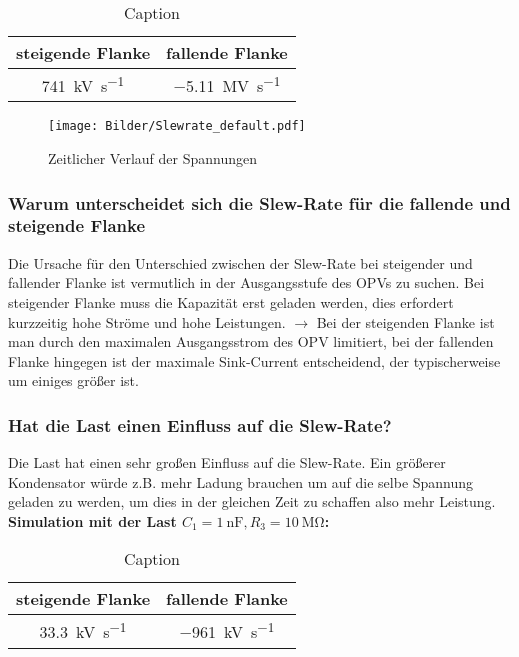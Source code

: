 \begin{table}[H]
    \centering
    \begin{tabular}{|c|c|}
    \hline
         steigende Flanke & fallende Flanke  \\ \hline
         \SI{741}{\kilo \volt \per \second} & \SI{-5.11}{\mega \volt \per \second} \\ \hline
    \end{tabular}
    \caption{Caption}
    \label{tab:my_label}
\end{table}
\begin{figure}[H]
    \centering
    \texttt{[image: Bilder/Slewrate\_default.pdf]}
    \caption{Zeitlicher Verlauf der Spannungen}
\end{figure}

\subsubsection{Warum unterscheidet sich die Slew-Rate für die fallende und steigende Flanke}

Die Ursache für den Unterschied zwischen der Slew-Rate bei steigender und fallender Flanke ist vermutlich in der Ausgangsstufe des OPVs zu suchen. Bei steigender Flanke muss die Kapazität erst geladen werden, dies erfordert kurzzeitig hohe Ströme und hohe Leistungen. $\rightarrow$ Bei der steigenden Flanke ist man durch den maximalen Ausgangsstrom des OPV limitiert, bei der fallenden Flanke hingegen ist der maximale Sink-Current entscheidend, der typischerweise um einiges größer ist.

\subsubsection{Hat die Last einen Einfluss auf die Slew-Rate?}

Die Last hat einen sehr großen Einfluss auf die Slew-Rate. Ein größerer Kondensator würde z.B. mehr Ladung brauchen um auf die selbe Spannung geladen zu werden, um dies in der gleichen Zeit zu schaffen also mehr Leistung.\\

\textbf{Simulation mit der Last $C_1 = \SI{1}{\nano \farad}, R_3 = \SI{10}{\mega \ohm}$:}

\begin{table}[H]
    \centering
    \begin{tabular}{|c|c|}
    \hline
         steigende Flanke & fallende Flanke  \\ \hline
         \SI{33.3}{\kilo \volt \per \second} & \SI{-961}{\kilo \volt \per \second} \\ \hline
    \end{tabular}
    \caption{Caption}
    \label{tab:my_label}
\end{table}

